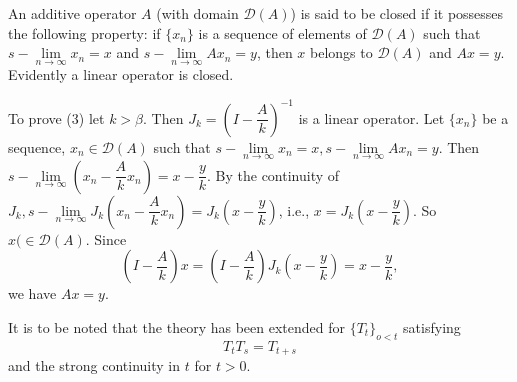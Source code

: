 \begin{Proof}%
 An additive operator $A$ (with domain $\mathscr{D} (A)$) is said to
 be closed if it possesses the following property: if $\{ x_n\}$ is a
 sequence of elements of $\mathscr{D}(A)$ such that $s-\lim\limits_{n
  \to \infty} x_n = x$ and $s-\lim\limits_{n \to \infty} A x_n =
 y$, then $x$ belongs to $\mathscr{D} (A)$ and $Ax = y$. Evidently a
 linear operator is closed. 
\end{Proof}

To prove (3) let $k > \beta$. Then $J_k = \left(I -
\dfrac{A}{k}\right)^{-1}$ 
is a linear operator. Let $\{x_n\}$ be a sequence, $x_n \in
\mathscr{D} (A)$ such that $s-\lim\limits_{n \to \infty} x_n = x,
s-\lim\limits_{n \to \infty} A x_n = y$. Then $s-\lim\limits_{n \to
 \infty} \left(x_n - \dfrac{A}{k} x_n\right) = x - \dfrac{y}{k}$. By the
continuity of $J_k, s-\lim\limits_{n \to \infty} J_k \left(x_n -
\dfrac{A}{k} x_n \right) = J_k \left(x - \dfrac{y}{k}\right)$, i.e.,
$x= J_k \left(x - \dfrac{y}{k}\right)$. So $x (\in \mathscr{D} (A)$. Since 
$$
\left(I - \frac{A}{k}\right) x = \left(I - \frac{A}{k}\right) J_k \left(x
- \frac{y}{k}\right) = x -\frac{y}{k}, 
$$
we have $A x = y$.

\begin{remark*} %
 It is to be noted that the theory has been extended for $\{ T_t\}_{o
  < t}$ satisfying 
  $$
 T_t T_s = T_{t + s}
 $$
 and the strong continuity in $t$ for $t > 0$.
\end{remark*}
